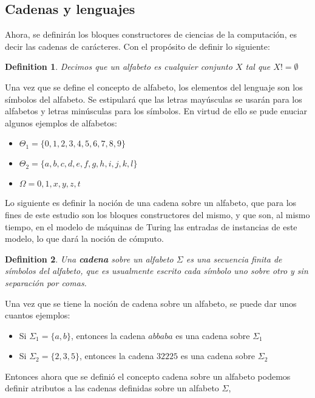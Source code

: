 \documentclass[10pt]{report}
\newtheorem{definition}{Definition}
\begin{document}
    \subsection{Cadenas y lenguajes}\label{sec:Cadenas-y-lenguajes}
    Ahora, se definirán los bloques constructores de ciencias de la computación, es decir las cadenas de carácteres.
    Con el propósito de definir lo siguiente:\space
    \begin{definition}
            Decimos que un alfabeto es cualquier conjunto $X$ tal que $X != \emptyset$
    \end{definition}
    \newline
    Una vez que se define el concepto de alfabeto, los elementos del lenguaje son los símbolos del alfabeto.
    Se estipulará que las letras mayúsculas se usarán para los alfabetos y letras minúsculas para los símbolos.
    En virtud de ello se pude enuciar algunos ejemplos de alfabetos:
    \begin{itemize}
        \item $\Theta_{1} = \{0,1,2,3,4,5,6,7,8,9 \}$
        \item $\Theta_{2} = \{a,b,c,d,e,f,g,h,i,j,k,l \}$
        \item $\Omega = { 0,1,x,y,z,t}$
    \end{itemize}\space
    Lo siguiente es definir la noción de una cadena sobre un alfabeto, que para los fines de este estudio
    son los bloques constructores del mismo, y que son, al mismo tiempo, en el modelo de
    máquinas de Turing las entradas de instancias de este modelo, lo que dará la noción de cómputo.
    \begin{definition}
        Una \textbf{cadena} sobre un alfabeto $\Sigma$ es una secuencia finita de símbolos del alfabeto,
       que es usualmente escrito cada símbolo uno sobre otro y sin separación por comas.
    \end{definition}
    Una vez que se tiene la noción de cadena sobre un alfabeto, se puede dar unos cuantos ejemplos:
    \begin{itemize}
        \item Si $\Sigma_{1} = \{a,b\}$, entonces la cadena $abbaba$ es una cadena sobre $\Sigma_{1}$
        \item Si $\Sigma_{2} = \{ 2,3,5 \}$, entonces la cadena $32225$ es una cadena sobre $\Sigma_{2}$
    \end{itemize}
    Entonces ahora que se definió el concepto cadena sobre un alfabeto podemos definir atributos a las cadenas definidas sobre un
    alfabeto $\Sigma$,\newline
\end{document}

